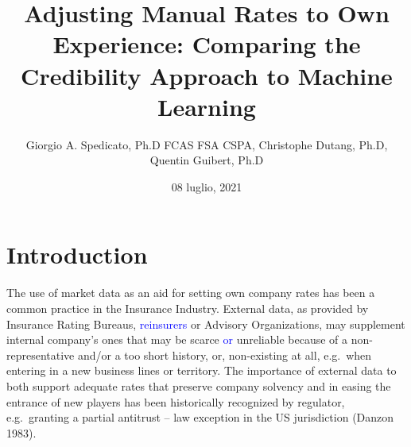 \documentclass[
]{article}
\title{Adjusting Manual Rates to Own Experience: Comparing the
Credibility Approach to Machine Learning}
\author{Giorgio A. Spedicato, Ph.D FCAS FSA CSPA, Christophe Dutang,
Ph.D, Quentin Guibert, Ph.D}
\date{08 luglio, 2021}
\begin{document}
\maketitle

{
\setcounter{tocdepth}{2}
\tableofcontents
}
\hypertarget{introduction}{%
\section{Introduction}\label{introduction}}

The use of market data as an aid for setting own company rates has been
a common practice in the Insurance Industry. External data, as provided
by Insurance Rating Bureaus, \textcolor{blue}{reinsurers} or Advisory
Organizations, may supplement internal company's ones that may be scarce
\textcolor{blue}{or} unreliable because of a non-representative and/or a
too short history, or, non-existing at all, e.g.~when entering in a new
business lines or territory. The importance of external data to both
support adequate rates that preserve company solvency and in easing the
entrance of new players has been historically recognized by regulator,
e.g.~granting a partial antitrust -- law exception in the US
jurisdiction (Danzon 1983).
\end{document}
